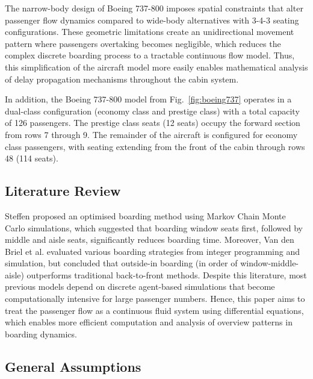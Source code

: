 \documentclass[12pt,a4paper]{article}
\begin{document}
The narrow-body design of Boeing 737-800 imposes spatial constraints that alter passenger flow dynamics compared to wide-body alternatives with 3-4-3 seating configurations. These geometric limitations create an unidirectional movement pattern where passengers overtaking becomes negligible, which reduces the complex discrete boarding process to a tractable continuous flow model. Thus, this simplification of the aircraft model more easily enables mathematical analysis of delay propagation mechanisms throughout the cabin system.

In addition, the Boeing 737-800 model from Fig.~\ref{fig:boeing737} operates in a dual-class configuration (economy class and prestige class) with a total capacity of 126 passengers. The prestige class seats (12 seats) occupy the forward section from rows 7 through 9. The remainder of the aircraft is configured for economy class passengers, with seating extending from the front of the cabin through rows 48 (114 seats).

\subsection{Literature Review}

Steffen \cite{steffen2008} proposed an optimised boarding method using Markov Chain Monte Carlo simulations, which suggested that boarding window seats first, followed by middle and aisle seats, significantly reduces boarding time. Moreover, Van den Briel et al. \cite{vandenbriel2005} evaluated various boarding strategies from integer programming and simulation, but concluded that outside-in boarding (in order of window-middle-aisle) outperforms traditional back-to-front methods. Despite this literature, most previous models depend on discrete agent-based simulations that become computationally intensive for large passenger numbers. Hence, this paper aims to treat the passenger flow as a continuous fluid system using differential equations, which enables more efficient computation and analysis of overview patterns in boarding dynamics.

\subsection{General Assumptions}
\end{document}
